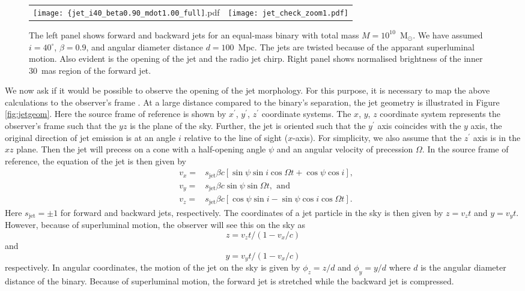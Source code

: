 \documentclass[a4paper,fleqn,usenatbib]{mnras}
\begin{document}
\begin{figure*}
\begin{center}
  \begin{tabular}{cc}
    \texttt{[image: \{jet\_i40\_beta0.90\_mdot1.00\_full]}.pdf} &
    \texttt{[image: jet\_check\_zoom1.pdf]}
  \end{tabular}
\end{center}
\caption{The left panel shows forward and backward jets for an
  equal-mass binary with total mass $M=10^{10}$~M$_\odot$.  We have
  assumed $i=40^\circ$, $\beta=0.9$, and angular diameter distance $d
  = 100$~Mpc.  The jets are twisted because of the apparant
  superluminal motion.  Also evident is the opening of the jet and the
  radio jet chirp.  Right panel shows normalised brightness of the
  inner 30~mas region of the forward jet.}
\label{fig:jet_mdot1.0}
\end{figure*}

We now ask if it would be possible to observe the opening of the jet
morphology.  For this purpose, it is necessary to map the above
calculations to the observer's frame \citep{1982ApJ...262..478G}.  At
a large distance compared to the binary's separation, the jet geometry
is illustrated in Figure \ref{fig:jetgeom}.  Here the source frame of
reference is shown by $x^\prime$, $y^\prime$, $z^\prime$ coordinate
systems.  The $x$, $y$, $z$ coordinate system represents the
observer's frame such that the $yz$ is the plane of the sky.  Further,
the jet is oriented such that the $y^\prime$ axis coincides with the
$y$ axis, the original direction of jet emission is at an angle $i$
relative to the line of sight ($x$-axis).  For simplicity, we also
assume that the $z^\prime$ axis is in the $xz$ plane.  Then the jet
will precess on a cone with a half-opening angle $\psi$ and an angular
velocity of precession $\Omega$.  In the source frame of reference,
the equation of the jet is then given by \citep{1981ApJ...246L.141H}
\begin{eqnarray}
  &v_x=&s_\mathrm{jet}\beta c\left[\sin\psi\sin i\cos\Omega t+\cos\psi\cos i\right],\\
  &v_y=&s_\mathrm{jet}\beta c\sin\psi\sin\Omega t,~\,\mathrm{and}\\
  &v_z=&s_\mathrm{jet}\beta c\left[\cos\psi\sin i-\sin\psi\cos i\cos\Omega t\right]. 
\end{eqnarray}
Here $s_\mathrm{jet}=\pm 1$ for forward and backward jets,
respectively.  The coordinates of a jet particle in the sky is then
given by $z=v_zt$ and $y=v_yt$.  However, because of superluminal
motion, the observer will see this on the sky as
\begin{equation}
  z=v_zt/(1-v_x/c)
\end{equation}
and
\begin{equation}
  y=v_yt/(1-v_x/c)
\end{equation}
respectively.  In angular coordinates, the motion of the jet on the
sky is given by $\phi_z=z/d$ and $\phi_y=y/d$ where $d$ is the angular
diameter distance of the binary.  Because of superluminal motion, the
forward jet is stretched while the backward jet is compressed.
\end{document}
